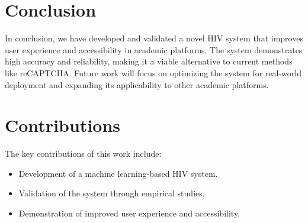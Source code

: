 \documentclass{article}
\begin{document}
\section{Conclusion}
In conclusion, we have developed and validated a novel HIV system that improves user experience and accessibility in academic platforms. The system demonstrates high accuracy and reliability, making it a viable alternative to current methods like reCAPTCHA. Future work will focus on optimizing the system for real-world deployment and expanding its applicability to other academic platforms.

\section{Contributions}
The key contributions of this work include:
\begin{itemize}
    \item Development of a machine learning-based HIV system.
    \item Validation of the system through empirical studies.
    \item Demonstration of improved user experience and accessibility.
\end{itemize}
\end{document}
